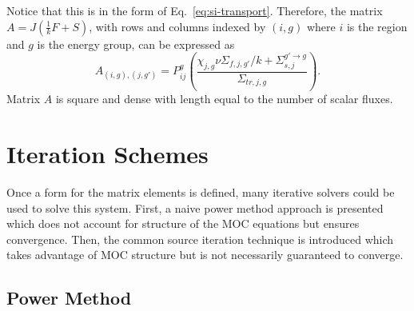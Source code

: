 Notice that this is in the form of Eq.~\ref{eq:si-transport}. Therefore, the matrix $A = J\left(\frac{1}{k}F + S\right)$, with rows and columns indexed by $(i, g)$  where $i$ is the region and $g$ is the energy group, can be expressed as
\begin{equation}
	A_{(i,g), (j, g')} = P_{ij}^g \left(\frac{\chi_{j,g} \nu\Sigma_{f,j,g'} / k + \Sigma_{s,j}^{g' \rightarrow g}}{\Sigma_{\textit{tr}, j, g}}\right).
	\label{eq:a-matrix}
\end{equation}
Matrix $A$ is square and dense with length equal to the number of scalar fluxes. 

\section{Iteration Schemes}
\label{sec:moc-iteration-schemes}

Once a form for the matrix elements is defined, many iterative solvers could be used to solve this system. First, a naive power method approach is presented which does not account for structure of the \ac{MOC} equations but ensures convergence. Then, the common source iteration technique is introduced which takes advantage of \ac{MOC} structure but is not necessarily guaranteed to converge.

\subsection{Power Method}

